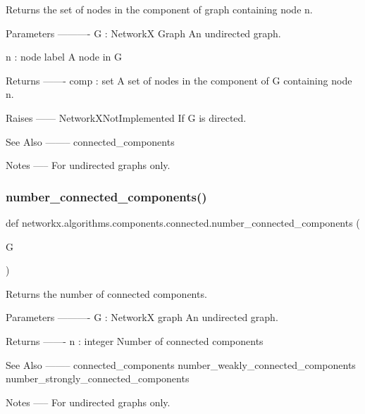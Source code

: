 \begin{DoxyVerb}Returns the set of nodes in the component of graph containing node n.

Parameters
----------
G : NetworkX Graph
   An undirected graph.

n : node label
   A node in G

Returns
-------
comp : set
   A set of nodes in the component of G containing node n.

Raises
------
NetworkXNotImplemented
    If G is directed.

See Also
--------
connected_components

Notes
-----
For undirected graphs only.\end{DoxyVerb}
 \mbox{\label{namespacenetworkx_1_1algorithms_1_1components_1_1connected_ab49892fb7b043be0c8f1d453c66d0c68}} 
\subsubsection{\texorpdfstring{number\+\_\+connected\+\_\+components()}{number\_connected\_components()}}
{\footnotesize\ttfamily def networkx.\+algorithms.\+components.\+connected.\+number\+\_\+connected\+\_\+components (\begin{DoxyParamCaption}\item[{}]{G }\end{DoxyParamCaption})}

\begin{DoxyVerb}Returns the number of connected components.

Parameters
----------
G : NetworkX graph
   An undirected graph.

Returns
-------
n : integer
   Number of connected components

See Also
--------
connected_components
number_weakly_connected_components
number_strongly_connected_components

Notes
-----
For undirected graphs only.\end{DoxyVerb}
 
